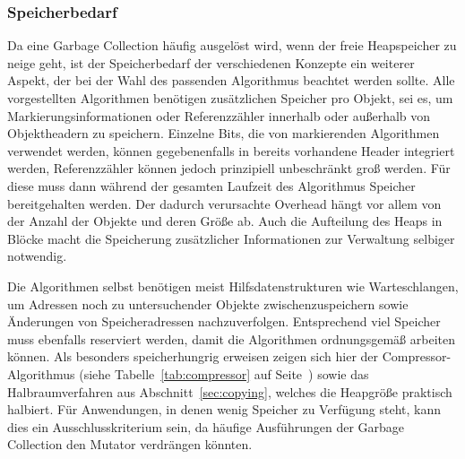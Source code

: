 

\subsubsection*{Speicherbedarf}
Da eine Garbage Collection häufig ausgelöst wird, wenn der freie Heapspeicher zu neige geht, ist der Speicherbedarf der verschiedenen Konzepte ein weiterer Aspekt, der bei der Wahl des passenden Algorithmus beachtet werden sollte.
Alle vorgestellten Algorithmen benötigen zusätzlichen Speicher pro Objekt, sei es, um Markierungsinformationen oder Referenzzähler innerhalb oder außerhalb von Objektheadern zu speichern.
Einzelne Bits, die von markierenden Algorithmen verwendet werden, können gegebenenfalls in bereits vorhandene Header integriert werden, Referenzzähler können jedoch prinzipiell unbeschränkt groß werden.
Für diese muss dann während der gesamten Laufzeit des Algorithmus Speicher bereitgehalten werden.
Der dadurch verursachte Overhead hängt vor allem von der Anzahl der Objekte und deren Größe ab.
Auch die Aufteilung des Heaps in Blöcke macht die Speicherung zusätzlicher Informationen zur Verwaltung selbiger notwendig.

Die Algorithmen selbst benötigen meist Hilfsdatenstrukturen wie Warteschlangen, um Adressen noch zu untersuchender Objekte zwischenzuspeichern sowie Änderungen von Speicheradressen nachzuverfolgen.
Entsprechend viel Speicher muss ebenfalls reserviert werden, damit die Algorithmen ordnungsgemäß arbeiten können.
Als besonders speicherhungrig erweisen zeigen sich hier der Compressor-Algorithmus (siehe Tabelle~\ref{tab:compressor} auf Seite~\pageref{tab:compressor}) sowie das Halbraumverfahren aus Abschnitt~\ref{sec:copying}, welches die Heapgröße praktisch halbiert.
Für Anwendungen, in denen wenig Speicher zu Verfügung steht, kann dies ein Ausschlusskriterium sein, da häufige Ausführungen der Garbage Collection den Mutator verdrängen könnten.




